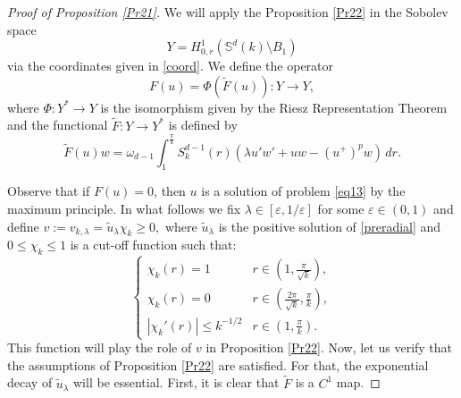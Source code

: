 \documentclass[reqno]{amsart}
\def\e{\varepsilon}
\numberwithin{equation}{section}
\newenvironment{key words}{\textbf{Keywords}\mbox{  }}{ }
\begin{document}
\begin{proof}[Proof of Proposition \ref{Pr21}] We will apply the Proposition \ref{Pr22} in the Sobolev space
\begin{equation}\label{Y}
  Y= H_{0,r}^{1}(\mathbb{S}^{d}(k)\setminus B_{1})
\end{equation}
via the coordinates given in \eqref{coord}. We define the operator
\[
F(u)=\Phi(\tilde{F}(u)):Y\rightarrow Y,
\]
where $\Phi:Y^{*}\rightarrow Y$ is the isomorphism given by the Riesz Representation Theorem and the functional
$\tilde{F}:Y\rightarrow Y^{*}$ is defined by
\[\tilde{F}(u)w=\omega_{d-1}\int_{1}^{\frac{\pi}{k}}S^{d-1}_{k}(r)(\lambda u'w'+uw-(u^{+})^{p}w) \, dr.\]

\medskip

Observe that if $F(u)=0$, then $u$ is a solution of problem \eqref{eq13} by the maximum principle. In what follows we fix $\lambda \in [\e, 1/\e]$ for some $\varepsilon \in (0,1)$ and define $v:=v_{k,\lambda}=\tilde{u}_\lambda\chi_{k}\geq 0 ,$ where $\tilde{u}_\lambda$ is the positive solution of \eqref{preradial} and $0 \leq \chi_k \leq 1$ is a cut-off function such that:
$$ \left \{ \begin{array}{ll} \chi_{k}(r)=1 &  r \in \left(1,\frac{\pi}{\sqrt{k}}\right), \\ \chi_{k}(r)=0 &  r \in \left(\frac{2\pi}{\sqrt{k}},\frac{\pi}{k}\right), \\ |\chi_{k}'(r)| \leq  k^{-1/2} &  r \in \left(1,\frac{\pi}{k}\right). \end{array} \right. $$
This function will play the role of $v$ in Proposition \ref{Pr22}. Now, let us verify that the assumptions of Proposition \ref{Pr22} are satisfied. For that, the exponential decay of $\tilde{u}_\lambda$ will be essential. First, it is clear that $\tilde{F}$ is a $C^1$ map.


\end{proof}
\end{document}
